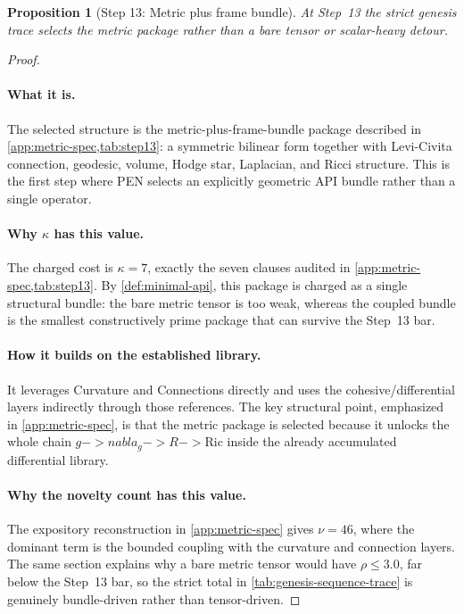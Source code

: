 \documentclass[11pt,a4paper]{article}
\def\to{->}%
\def\nabla{nabla}%
\theoremstyle{plain}
\newtheorem{proposition}[theorem]{Proposition}
\theoremstyle{definition}
\theoremstyle{remark}
\begin{document}
\begin{proposition}[Step 13: Metric plus frame bundle]
\label{prop:genesis-step13}
At Step~13 the strict genesis trace selects the metric package rather than a
bare tensor or scalar-heavy detour.
\end{proposition}

\begin{proof}
\paragraph{What it is.}
The selected structure is the metric-plus-frame-bundle package described in
\cref{app:metric-spec,tab:step13}: a symmetric bilinear form together with
Levi-Civita connection, geodesic, volume, Hodge star, Laplacian, and Ricci
structure.
This is the first step where PEN selects an explicitly geometric API bundle
rather than a single operator.

\paragraph{Why $\kappa$ has this value.}
The charged cost is $\kappa=7$, exactly the seven clauses audited in
\cref{app:metric-spec,tab:step13}.
By \cref{def:minimal-api}, this package is charged as a single structural bundle:
the bare metric tensor is too weak, whereas the coupled bundle is the smallest
constructively prime package that can survive the Step~13 bar.

\paragraph{How it builds on the established library.}
It leverages Curvature and Connections directly and uses the cohesive/differential
layers indirectly through those references.
The key structural point, emphasized in \cref{app:metric-spec}, is that the
metric package is selected because it unlocks the whole chain
$g\to\nabla_g\to R\to\mathrm{Ric}$ inside the already accumulated differential
library.

\paragraph{Why the novelty count has this value.}
The expository reconstruction in \cref{app:metric-spec} gives
$\nu=46$, where the dominant term is the bounded coupling with the
curvature and connection layers.
The same section explains why a bare metric tensor would have
$\rho\le 3.0$, far below the Step~13 bar, so the strict total in
\cref{tab:genesis-sequence-trace} is genuinely bundle-driven rather than
tensor-driven.


\end{proof}
\end{document}

